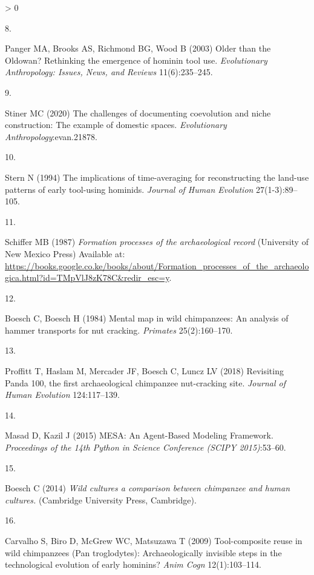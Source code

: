 \documentclass[9pt,twocolumn,twoside,]{pnas-new}
\newlength{\csllabelwidth}
\newlength{\cslhangindent}
\newenvironment{CSLReferences}[3] %
 {%
  \setlength{\parindent}{0pt}
  \ifodd #1 \everypar{\setlength{\hangindent}{\cslhangindent}}\ignorespaces\fi
  \ifnum #2 > 0
  \setlength{\parskip}{#2\baselineskip}
  \fi
 }%
 {}
\newcommand{\CSLLeftMargin}[1]{\parbox[t]{\csllabelwidth}{#1}}
\newcommand{\CSLRightInline}[1]{\parbox[t]{\linewidth - \csllabelwidth}{#1}}
\begin{document}
\begin{CSLReferences}{0}{0}
\leavevmode\hypertarget{ref-pangerOlderOldowanRethinking2003}{}%
\CSLLeftMargin{8. }
\CSLRightInline{Panger MA, Brooks AS, Richmond BG, Wood B (2003) Older
than the {Oldowan}? {Rethinking} the emergence of hominin tool use.
\emph{Evolutionary Anthropology: Issues, News, and Reviews}
11(6):235--245.}

\leavevmode\hypertarget{ref-stinerChallengesDocumentingCoevolution2020}{}%
\CSLLeftMargin{9. }
\CSLRightInline{Stiner MC (2020) The challenges of documenting
coevolution and niche construction: {The} example of domestic spaces.
\emph{Evolutionary Anthropology}:evan.21878.}

\leavevmode\hypertarget{ref-sternImplicationsTimeaveragingReconstructing1994}{}%
\CSLLeftMargin{10. }
\CSLRightInline{Stern N (1994) The implications of time-averaging for
reconstructing the land-use patterns of early tool-using hominids.
\emph{Journal of Human Evolution} 27(1-3):89--105.}

\leavevmode\hypertarget{ref-schifferFormationProcessesArchaeological1987}{}%
\CSLLeftMargin{11. }
\CSLRightInline{Schiffer MB (1987) \emph{Formation processes of the
archaeological record} ({University of New Mexico Press}) Available at:
\url{https://books.google.co.ke/books/about/Formation_processes_of_the_archaeologica.html?id=TMpVlJ8zK78C\&redir_esc=y}.}

\leavevmode\hypertarget{ref-boeschMentalMapWild1984}{}%
\CSLLeftMargin{12. }
\CSLRightInline{Boesch C, Boesch H (1984) Mental map in wild
chimpanzees: {An} analysis of hammer transports for nut cracking.
\emph{Primates} 25(2):160--170.}

\leavevmode\hypertarget{ref-proffittRevisitingPanda1002018}{}%
\CSLLeftMargin{13. }
\CSLRightInline{Proffitt T, Haslam M, Mercader JF, Boesch C, Luncz LV
(2018) Revisiting {Panda} 100, the first archaeological chimpanzee
nut-cracking site. \emph{Journal of Human Evolution} 124:117--139.}

\leavevmode\hypertarget{ref-masadMESAAgentBasedModeling2015}{}%
\CSLLeftMargin{14. }
\CSLRightInline{Masad D, Kazil J (2015) {MESA}: {An Agent}-{Based
Modeling Framework}. \emph{Proceedings of the 14th Python in Science
Conference (SCIPY 2015)}:53--60.}

\leavevmode\hypertarget{ref-boeschWildCulturesComparison2014}{}%
\CSLLeftMargin{15. }
\CSLRightInline{Boesch C (2014) \emph{Wild cultures a comparison between
chimpanzee and human cultures.} ({Cambridge University Press},
{Cambridge}).}

\leavevmode\hypertarget{ref-carvalhoToolcompositeReuseWild2009}{}%
\CSLLeftMargin{16. }
\CSLRightInline{Carvalho S, Biro D, McGrew WC, Matsuzawa T (2009)
Tool-composite reuse in wild chimpanzees ({Pan} troglodytes):
Archaeologically invisible steps in the technological evolution of early
hominins? \emph{Anim Cogn} 12(1):103--114.}


\end{CSLReferences}
\end{document}
